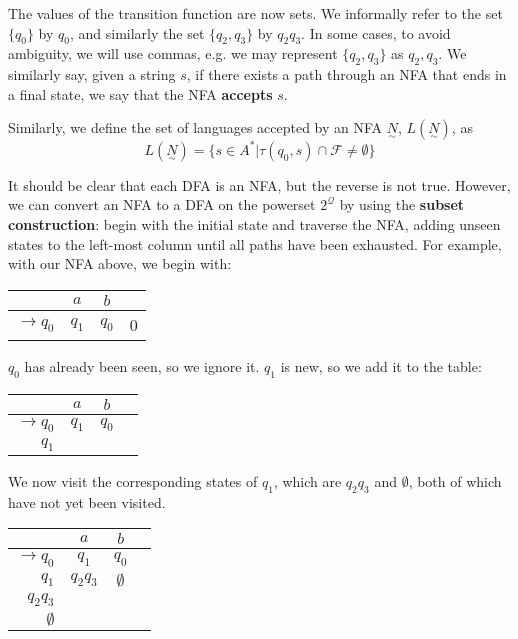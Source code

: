 The values of the transition function are now sets. We informally refer to the set $\{q_0\}$ by $q_0$, and similarly the set $\{q_2, q_3\}$ by $q_2q_3$. In some cases, to avoid ambiguity, we will use commas, e.g. we may represent $\{q_2, q_3\}$ as $q_2,q_3$. We similarly say, given a string $s$, if there exists a path through an NFA that ends in a final state, we say that the NFA \textbf{accepts} $s$.

Similarly, we define the set of languages accepted by an NFA $\underset{\sim}{N}$, $L(\underset{\sim}{N})$, as \[L(\underset{\sim}{N}) = \{s\in A^*|\tau(q_0, s)\cap\mathcal{F}\neq\emptyset\}\]

It should be clear that each DFA is an NFA, but the reverse is not true. However, we can convert an NFA to a DFA on the powerset $2^{\mathcal{Q}}$ by using the \textbf{subset construction}: begin with the initial state and traverse the NFA, adding unseen states to the left-most column until all paths have been exhausted. For example, with our NFA above, we begin with:

\begin{center}\begin{tabular}{r|c c r}
         & $a$ & $b$ & \\\hline
    $\to q_0$ & $q_1$ & $q_0$ & 0 \\
\end{tabular}\end{center}

$q_0$ has already been seen, so we ignore it. $q_1$ is new, so we add it to the table:

\begin{center}\begin{tabular}{r|c c r}
         & $a$ & $b$ & \\\hline
    $\to q_0$ & $q_1$ & $q_0$ &  \\
          $q_1$ &       &       & 
\end{tabular}\end{center}

We now visit the corresponding states of $q_1$, which are $q_2q_3$ and $\emptyset$, both of which have not yet been visited. 

\begin{center}\begin{tabular}{r|c c r}
         & $a$ & $b$ & \\\hline
    $\to q_0$ & $q_1$ & $q_0$ &  \\
          $q_1$ & $q_2q_3$ & $\emptyset$ & \\
          $q_2q_3$ & & & \\
          $\emptyset$ & & &
\end{tabular}\end{center}

